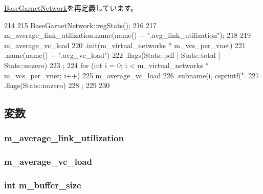 \hyperlink{classBaseGarnetNetwork_a4dc637449366fcdfc4e764cdf12d9b11}{BaseGarnetNetwork}を再定義しています。


\begin{DoxyCode}
214 {
215     BaseGarnetNetwork::regStats();
216 
217     m_average_link_utilization.name(name() + ".avg_link_utilization");
218 
219     m_average_vc_load
220         .init(m_virtual_networks * m_vcs_per_vnet)
221         .name(name() + ".avg_vc_load")
222         .flags(Stats::pdf | Stats::total | Stats::nozero)
223         ;
224     for (int i = 0; i < m_virtual_networks * m_vcs_per_vnet; i++) {
225         m_average_vc_load
226             .subname(i, csprintf(".%
227             .flags(Stats::nozero)
228             ;
229     }
230 }
\end{DoxyCode}


\subsection{変数}
\hypertarget{classGarnetNetwork_a980fb21ae994fd27b0f9a935aa21edee}{
\subsubsection[{m\_\-average\_\-link\_\-utilization}]{ {\bf m\_\-average\_\-link\_\-utilization}}}
\label{classGarnetNetwork_a980fb21ae994fd27b0f9a935aa21edee}
\hypertarget{classGarnetNetwork_aeaf247f4cb25e8bbafa5d0e629e6be10}{
\subsubsection[{m\_\-average\_\-vc\_\-load}]{ {\bf m\_\-average\_\-vc\_\-load}}}
\label{classGarnetNetwork_aeaf247f4cb25e8bbafa5d0e629e6be10}
\hypertarget{classGarnetNetwork_ad58a86eb05a281840a92bb3d04adb9b1}{
\subsubsection[{m\_\-buffer\_\-size}]{\setlength{\rightskip}{0pt plus 5cm}int {\bf m\_\-buffer\_\-size}}}
